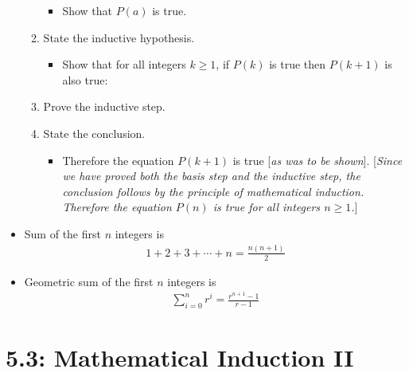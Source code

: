 \documentclass{article}
\begin{document}
\begin{itemize}
\begin{enumerate}
\begin{itemize}
                            \item Show that $P(a)$ is true.
                        \end{itemize}
                    \item State the inductive hypothesis.
                        \begin{itemize}
                            \item Show that for all integers $k \geq 1$, if $P(k)$ is true then $P(k+1)$ is also true:
                        \end{itemize}
                    \item Prove the inductive step.
                    \item State the conclusion.
                        \begin{itemize}
                            \item Therefore the equation $P(k+1)$ is true [\textit{as was to be shown}]. [\textit{Since we have proved both the basis step and the inductive step, the conclusion follows by the principle of mathematical induction. Therefore the equation $P(n)$ is true for all integers $n \geq 1$.}]
                        \end{itemize}
                \end{enumerate}
            \item Sum of the first $n$ integers is
                \begin{align*}
                    1 + 2 + 3 + \cdots + n = \frac{n(n+1)}{2}
                \end{align*}
            \item Geometric sum of the first $n$ integers is
                \begin{align*}
                    \sum_{i=0}^{n} r^i = \frac{r^{n+1}-1}{r-1}
                \end{align*}
        \end{itemize}

\newpage \section{5.3: Mathematical Induction II}
\end{document}
